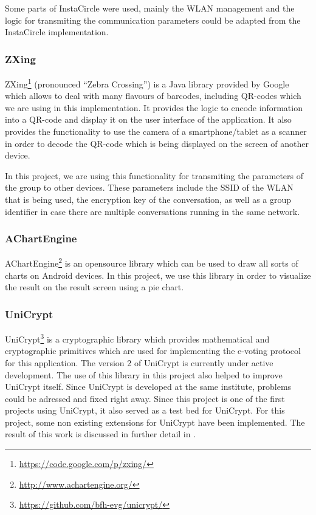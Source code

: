 \documentclass[numbers=noenddot, abstract=on, a4paper, headsepline,
footsepline, oneside, draft=off]{scrreprt}
\begin{document}
Some parts of InstaCircle were used, mainly the WLAN management and the logic
for transmiting the communication parameters could be adapted from the
InstaCircle implementation.

\subsubsection{ZXing}
ZXing\footnote{\url{https://code.google.com/p/zxing/}} (pronounced ``Zebra
Crossing'') is a Java library provided by Google which allows to deal with many
flavours of barcodes, including QR-codes which we are using in this
implementation. It provides the logic to encode information into a QR-code and
display it on the user interface of the application. It also provides the
functionality to use the camera of a smartphone/tablet as a scanner in order to
decode the QR-code which is being displayed on the screen of another device.

In this project, we are using this functionality for transmiting the parameters
of the group to other devices. These parameters include the SSID of the WLAN
that is being used, the encryption key of the conversation, as well as a group
identifier in case there are multiple conversations running in the same network.

\subsubsection{AChartEngine}
AChartEngine\footnote{\url{http://www.achartengine.org/}} is an opensource
library which can be used to draw all sorts of charts on Android devices. In
this project, we use this library in order to visualize the result on the
result screen using a pie chart.

\subsubsection{UniCrypt}
UniCrypt\footnote{\url{https://github.com/bfh-evg/unicrypt/}} is a cryptographic
library which provides mathematical and cryptographic primitives which are used
for implementing the e-voting protocol for this application. The version 2 of
UniCrypt is currently under active development. The use of this library in this
project also helped to improve UniCrypt itself. Since UniCrypt is developed at
the same institute, problems could be adressed and fixed right away. Since this
project is one of the first projects using UniCrypt, it also served as a test
bed for UniCrypt. For this project, some non existing extensions for UniCrypt
have been implemented. The result of this work is discussed in further detail in
.
\end{document}

